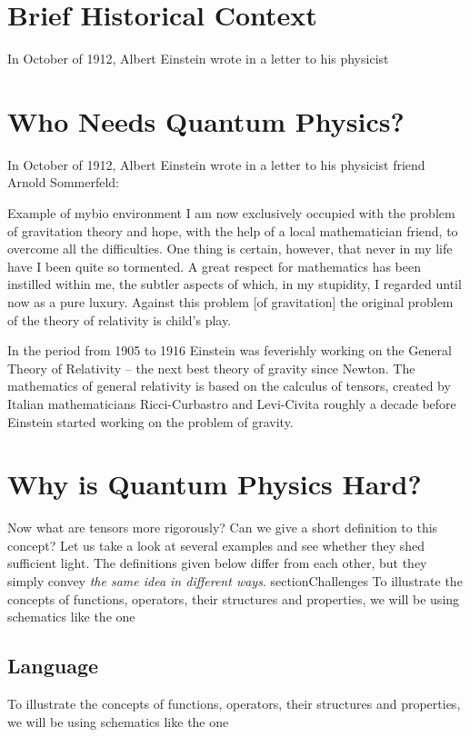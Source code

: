 \section{Brief Historical Context}
In October of 1912, Albert Einstein wrote in a letter to his physicist

\section{Who Needs Quantum Physics?}

In October of 1912, Albert Einstein wrote in a letter to his physicist
friend Arnold Sommerfeld:
\begin{mybio}{Example of mybio environment}
  I am now exclusively occupied with the problem of gravitation theory
and hope, with the help of a local mathematician friend, to overcome
all the difficulties. One thing is certain, however, that never in my
life have I been quite so tormented. A great respect for mathematics
has been instilled within me, the subtler aspects of which, in my stupidity,
I regarded until now as a pure luxury. Against this problem [of
  gravitation] the original problem of the theory of relativity is
child’s play.
\end{mybio}
In the period from 1905 to 1916 Einstein was feverishly working on the
General Theory of Relativity -- the next
best theory of gravity since
Newton. The mathematics of general relativity is based on the calculus
of tensors, created by Italian mathematicians Ricci-Curbastro and
Levi-Civita roughly a decade before Einstein started working on the
problem of gravity.


\section{Why is Quantum Physics Hard?}\label{sec:ExampleDefinitions}
Now what are tensors more rigorously? Can we give a short definition
to this concept?
Let us take a look at several examples and see whether they shed
sufficient light. The definitions given below differ from each other,
but they simply convey \emph{the same idea in different ways}.
section{Challenges}
To illustrate the concepts of functions, operators, their structures and
properties, we will be using schematics like the one

\subsection{Language}
To illustrate the concepts of functions, operators, their structures and
properties, we will be using schematics like the one

